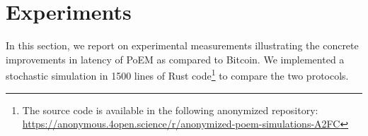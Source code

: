 \section{Experiments}\label{sec:experiments}

In this section, we report on experimental measurements illustrating the concrete improvements
in latency of PoEM as compared to Bitcoin. We implemented a stochastic simulation in 1500 lines of
Rust code\footnote{The source code is available in the following anonymized repository:
\url{https://anonymous.4open.science/r/anonymized-poem-simulations-A2FC}} to compare the two protocols.

%
